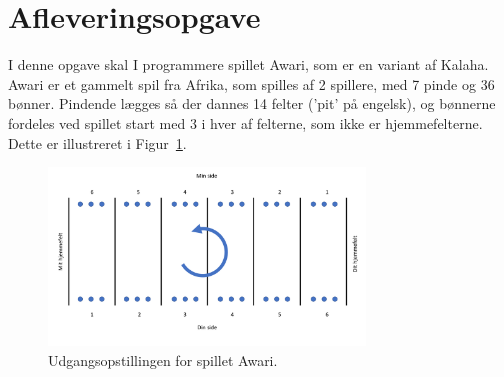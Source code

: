 \documentclass[a4paper,12pt]{article}
\begin{document}


\section*{Afleveringsopgave}
I denne opgave skal I programmere spillet Awari, som er en variant af
Kalaha. Awari er et gammelt spil fra Afrika, som spilles af 2
spillere, med 7 pinde og 36 bønner. Pindende lægges så der dannes 14
felter ('pit' på engelsk), og bønnerne fordeles ved spillet start med 3 i hver af
felterne, som ikke er hjemmefelterne. Dette er illustreret i
Figur~\ref{fig:awari}.
\begin{figure}
  \centering
  \includegraphics[width=0.75\textwidth]{awari.pdf}
  \caption{Udgangsopstillingen for spillet Awari.}
  \label{fig:awari}
\end{figure}
\end{document}
